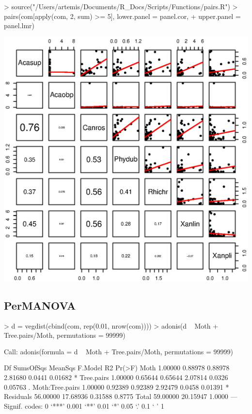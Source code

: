 \documentclass[a4paper]{article}
\begin{document}
\begin{Schunk}
\begin{Sinput}
> source("/Users/artemis/Documents/R_Docs/Scripts/Functions/pairs.R")
> pairs(com[apply(com, 2, sum) >= 5], lower.panel = panel.cor, 
+     upper.panel = panel.lmr)
\end{Sinput}
\end{Schunk}
\includegraphics{SCRL_tex-009}

\subsection{PerMANOVA}

\begin{Schunk}
\begin{Sinput}
> d = vegdist(cbind(com, rep(0.01, nrow(com))))
> adonis(d ~ Moth + Tree.pairs/Moth, permutations = 99999)
\end{Sinput}
\begin{Soutput}
Call:
adonis(formula = d ~ Moth + Tree.pairs/Moth, permutations = 99999) 

                      Df SumsOfSqs  MeanSqs  F.Model     R2  Pr(>F)  
Moth             1.00000   0.88978  0.88978  2.81680 0.0441 0.01682 *
Tree.pairs       1.00000   0.65644  0.65644  2.07814 0.0326 0.05763 .
Moth:Tree.pairs  1.00000   0.92389  0.92389  2.92479 0.0458 0.01391 *
Residuals       56.00000  17.68936  0.31588          0.8775          
Total           59.00000  20.15947                   1.0000          
---
Signif. codes:  0 ‘***’ 0.001 ‘**’ 0.01 ‘*’ 0.05 ‘.’ 0.1 ‘ ’ 1 
\end{Soutput}
\end{Schunk}
\end{document}

